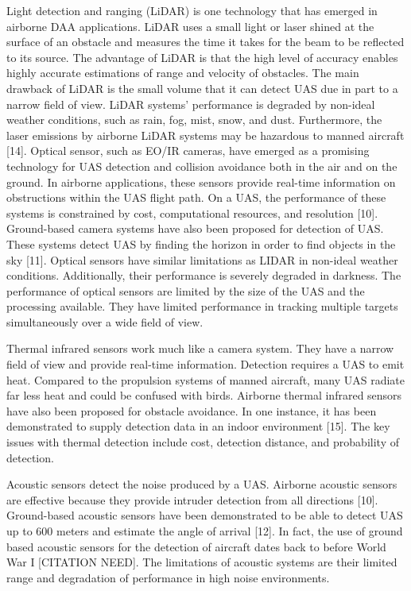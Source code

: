 \documentclass[journal,transmag]{IEEEtran}
\begin{document}
Light detection and ranging (LiDAR) is one technology that has emerged in airborne DAA applications. LiDAR uses a small light or laser shined at the surface of an obstacle and measures the time it takes for the beam to be reflected to its source.  The advantage of LiDAR is that the high level of accuracy enables highly accurate estimations of range and velocity of obstacles. The main drawback of LiDAR is the small volume that it can detect UAS due in part to a narrow field of view. LiDAR systems’ performance is degraded by non-ideal weather conditions, such as rain, fog, mist, snow, and dust. Furthermore, the laser emissions by airborne LiDAR systems may be hazardous to manned aircraft [14]. 
Optical sensor, such as EO/IR cameras, have emerged as a promising technology for UAS detection and collision avoidance both in the air and on the ground. In airborne applications, these sensors provide real-time information on obstructions within the UAS flight path. On a UAS, the performance of these systems is constrained by cost, computational resources, and resolution [10]. Ground-based camera systems have also been proposed for detection of UAS. These systems detect UAS by finding the horizon in order to find objects in the sky [11]. Optical sensors have similar limitations as LIDAR in non-ideal weather conditions. Additionally, their performance is severely degraded in darkness.  The performance of optical sensors are limited by the size of the UAS and the processing available. They have limited performance in tracking multiple targets simultaneously over a wide field of view.

Thermal infrared sensors work much like a camera system. They have a narrow field of view and provide real-time information. Detection requires a UAS to emit heat. Compared to the propulsion systems of manned aircraft, many UAS   radiate far less heat and could be confused with birds. Airborne thermal infrared sensors have also been proposed for obstacle avoidance. In one instance, it has been demonstrated to supply detection data in an indoor environment [15]. The key issues with thermal detection include cost, detection distance, and probability of detection.

Acoustic sensors detect the noise produced by a UAS. Airborne acoustic sensors are effective because they provide intruder detection from all directions [10]. Ground-based acoustic sensors have been demonstrated to be able to detect UAS up to 600 meters and estimate the angle of arrival [12]. In fact, the use of ground based acoustic sensors for the detection of aircraft dates back to before World War I [CITATION NEED]. The limitations of acoustic systems are their limited range and degradation of performance in high noise environments. 
\end{document}
